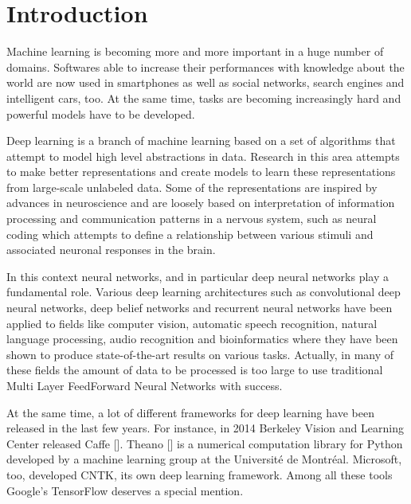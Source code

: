  \chapter{Introduction}\label{ch:introduction}

Machine learning is becoming more and more important in a huge number of domains. Softwares able to increase their performances with knowledge about the world are now used in smartphones as well as social networks, search engines and intelligent cars, too. At the same time, tasks are becoming increasingly hard and powerful models have to be developed.

Deep learning is a branch of machine learning based on a set of algorithms that attempt to model high level abstractions in data.
Research in this area attempts to make better representations and create models to learn these representations from large-scale unlabeled data. Some of the representations are inspired by advances in neuroscience and are loosely based on interpretation of information processing and communication patterns in a nervous system, such as neural coding which attempts to define a relationship between various stimuli and associated neuronal responses in the brain.

In this context neural networks, and in particular deep neural networks play a fundamental role. Various deep learning architectures such as convolutional deep neural networks, deep belief networks and recurrent neural networks have been applied to fields like computer vision, automatic speech recognition, natural language processing, audio recognition and bioinformatics where they have been shown to produce state-of-the-art results on various tasks. Actually, in many of these fields the amount of data to be processed is too large to use traditional Multi Layer FeedForward Neural Networks with success.

At the same time, a lot of different frameworks for deep learning have been released in the last few years. For instance, in 2014 Berkeley Vision and Learning Center released Caffe [\cite{jia2014caffe}]. Theano [\cite{2016arXiv160502688full}] is a numerical computation library for Python developed by a machine learning group at the Université de Montréal. Microsoft, too, developed CNTK,  its own deep learning framework. Among all these tools Google's TensorFlow deserves a special mention. 
